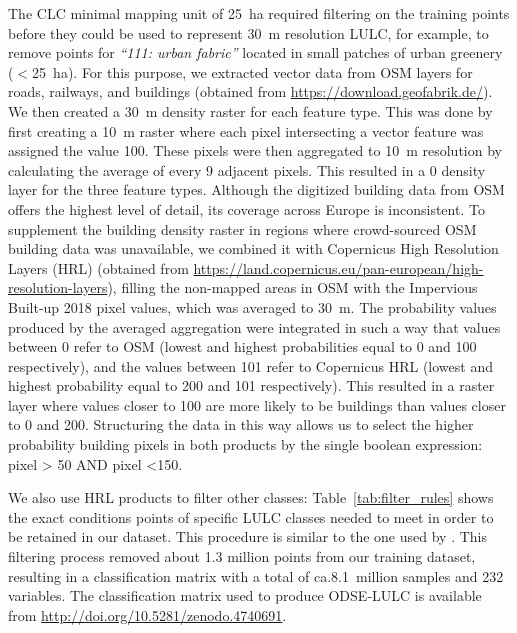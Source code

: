     The CLC minimal mapping unit of 25~ha required filtering on the training points before they could be used to represent 30~m resolution LULC, for example, to remove points for \emph{``111: urban fabric''} located in small patches of urban greenery ($<$25~ha). For this purpose, we extracted vector data from OSM layers for roads, railways, and buildings (obtained from \url{https://download.geofabrik.de/}). We then created a 30~m density raster for each feature type. This was done by first creating a 10~m raster where each pixel intersecting a vector feature was assigned the value 100. These pixels were then aggregated to 10~m resolution by calculating the average of every 9 adjacent pixels.
    This resulted in a 0 density layer for the three feature types. 
    Although the digitized building data from OSM offers the highest level of detail, its coverage across Europe is inconsistent. To supplement the building density raster in regions where crowd-sourced OSM building data was unavailable, we combined it with Copernicus High Resolution Layers (HRL) (obtained from \url{https://land.copernicus.eu/pan-european/high-resolution-layers}), filling  the non-mapped areas in OSM with the Impervious Built-up 2018 pixel values, which was averaged to 30~m. The probability values produced by the averaged aggregation were integrated in such a way that values between 0 refer to OSM (lowest and highest probabilities equal to 0 and 100 respectively), and the values between 101 refer to Copernicus HRL (lowest and highest probability equal to 200 and 101 respectively). This resulted in a raster layer where values closer to 100 are more likely to be buildings than values closer to 0 and 200. Structuring the data in this way allows us to select the higher probability building pixels in both products by the single boolean expression: pixel \textgreater{} 50 AND pixel \textless 150.
    
    We also use HRL products to filter other classes: Table\@~\ref{tab:filter_rules} shows the exact conditions points of specific LULC classes needed to meet in order to be retained in our dataset. This procedure is similar to the one used by \citet{inglada2017operational}. This filtering process removed about 1.3 million points from our training dataset, resulting in a classification matrix with a total of ca.\@ 8.1~million samples and 232 variables. The classification matrix used to produce  ODSE-LULC is available from \url{http://doi.org/10.5281/zenodo.4740691}.
    
